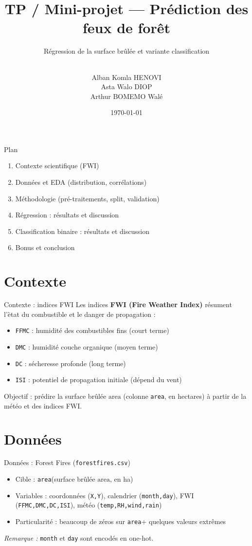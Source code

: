 \documentclass[aspectratio=169,11pt]{beamer}
\title[Forest Fires]{TP / Mini-projet — Pr\'ediction des feux de for\^et}
\subtitle{R\'egression de la surface br\^ul\'ee et variante classification}
\author[\GroupName]{\texorpdfstring{\GroupName\\[0.2em]
Alban Komla HENOVI\\
Asta Walo DIOP\\
Arthur BOMEMO Wal\'e}{\GroupName}}
\institute{Cours Python — Semestre 1}
\date{\today}
\newcommand{\Area}{\ensuremath{\mathrm{area}}}
\newcommand{\AreaCol}{\texttt{area}}
\begin{document}
\begin{frame}[plain]
  \titlepage
\end{frame}

\begin{frame}{Plan}
  \begin{enumerate}
    \item Contexte scientifique (FWI)
    \item Donn\'ees et EDA (distribution, corr\'elations)
    \item M\'ethodologie (pr\'e-traitements, split, validation)
    \item R\'egression : r\'esultats et discussion
    \item Classification binaire : r\'esultats et discussion
    \item Bonus et conclusion
  \end{enumerate}
\end{frame}

\section{Contexte}

\begin{frame}{Contexte : indices FWI}
  Les indices \textbf{FWI (Fire Weather Index)} r\'esument l'\og \`etat du combustible\fg{} et le danger de propagation :
  \begin{itemize}
    \item \texttt{FFMC} : humidit\'e des combustibles fins (court terme)
    \item \texttt{DMC} : humidit\'e couche organique (moyen terme)
    \item \texttt{DC} : s\'echeresse profonde (long terme)
    \item \texttt{ISI} : potentiel de propagation initiale (d\'epend du vent)
  \end{itemize}
  Objectif : pr\'edire la surface br\^ul\'ee $\Area$ (colonne \AreaCol, en hectares) \`a partir de la m\'et\'eo et des indices FWI.
\end{frame}

\section{Donn\'ees}

\begin{frame}{Donn\'ees : Forest Fires (\texttt{forestfires.csv})}
  \begin{itemize}
    \item Cible : \AreaCol (surface br\^ul\'ee $\Area$, en ha)
    \item Variables : coordonn\'ees (\texttt{X,Y}), calendrier (\texttt{month,day}), FWI (\texttt{FFMC,DMC,DC,ISI}), m\'et\'eo (\texttt{temp,RH,wind,rain})
    \item Particularit\'e : beaucoup de z\'eros sur \AreaCol + quelques valeurs extr\^emes
  \end{itemize}

  \vspace{0.6em}
  \textit{Remarque :} \texttt{month} et \texttt{day} sont encod\'es en one-hot.
\end{frame}
\end{document}

